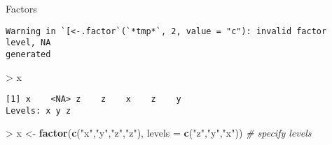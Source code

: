 \documentclass[10pt,ignorenonframetext,compress, aspectratio=169]{beamer}
\newenvironment{Shaded}{\begin{snugshade}}{\end{snugshade}}
\newcommand{\KeywordTok}[1]{\textcolor[rgb]{0.13,0.29,0.53}{\textbf{{#1}}}}
\newcommand{\DataTypeTok}[1]{\textcolor[rgb]{0.13,0.29,0.53}{{#1}}}
\newcommand{\StringTok}[1]{\textcolor[rgb]{0.31,0.60,0.02}{{#1}}}
\newcommand{\CommentTok}[1]{\textcolor[rgb]{0.56,0.35,0.01}{\textit{{#1}}}}
\newcommand{\NormalTok}[1]{{#1}}
\begin{document}
\begin{frame}[fragile]{Factors}
\begin{verbatim}
Warning in `[<-.factor`(`*tmp*`, 2, value = "c"): invalid factor level, NA
generated
\end{verbatim}

\begin{Shaded}
\begin{Highlighting}[]
\NormalTok{>}\StringTok{ }\NormalTok{x}
\end{Highlighting}
\end{Shaded}

\begin{verbatim}
[1] x    <NA> z    z    x    z    y   
Levels: x y z
\end{verbatim}

\begin{Shaded}
\begin{Highlighting}[]
\NormalTok{>}\StringTok{ }\NormalTok{x <-}\StringTok{ }\KeywordTok{factor}\NormalTok{(}\KeywordTok{c}\NormalTok{(}\StringTok{"x"}\NormalTok{,}\StringTok{"y"}\NormalTok{,}\StringTok{"z"}\NormalTok{,}\StringTok{"z"}\NormalTok{), }\DataTypeTok{levels =} \KeywordTok{c}\NormalTok{(}\StringTok{"z"}\NormalTok{,}\StringTok{"y"}\NormalTok{,}\StringTok{"x"}\NormalTok{)) }\CommentTok{# specify levels}
\end{Highlighting}
\end{Shaded}

\end{frame}
\end{document}
